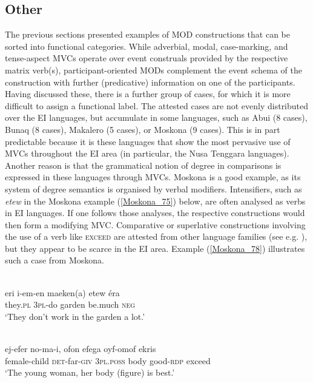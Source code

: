 \subsection{Other}

The previous sections presented examples of MOD constructions that can be sorted into functional categories. While adverbial, modal, case-marking, and tense-aspect MVCs operate over event construals provided by the respective matrix verb(s), participant-oriented MODs complement the event schema of the construction with further (predicative) information on one of the participants. Having discussed these, there is a further group of cases, for which it is more difficult to assign a functional label. The attested cases are not evenly distributed over the EI languages, but accumulate in some languages, such as Abui (8 cases), Bunaq (8 cases), Makalero (5 cases), or Moskona (9 cases). This is in part predictable because it is these languages that show the most pervasive use of MVCs throughout the EI area (in particular, the Nusa Tenggara languages). Another reason is that the grammatical notion of degree in comparisons is expressed in these languages through MVCs. Moskona is a good example, as its system of degree semantics is organised by verbal modifiers. Intensifiers, such as \textit{etew} in the Moskona example (\ref{Moskona_75}) below, are often analysed as verbs in EI languages. If one follows those analyses, the respective constructions would then form a modifying MVC. Comparative or superlative constructions involving the use of a verb like \textsc{exceed} are attested from other language families (see e.g. \citealt{Aikhenvald2006}), but they appear to be scarce in the EI area. Example (\ref{Moskona_78}) illustrates such a case from Moskona.

\ea \label{Moskona_75}
\\
\gll eri i-em-en maeken(a) etew éra \\
they.\textsc{pl} 3\textsc{pl}-do garden be.much \textsc{neg} \\
\glft `They don’t work in the garden a lot.’ \\ 
\z

\ea \label{Moskona_78}
\\
\gll ej-efer no-ma-i, ofon efega oyf-omof ekris \\
female-child \textsc{det}-far-\textsc{giv} 3\textsc{pl}.\textsc{poss} body good-\textsc{rdp} exceed \\
\glft `The young woman, her body (figure) is best.'\\ 
\z

